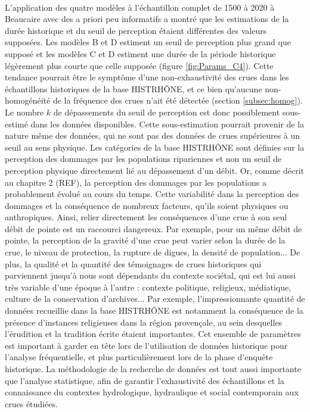 	\paragraph{} L'application des quatre modèles à l'échantillon complet de 1500 à 2020 à Beaucaire avec des a priori peu informatifs a montré que les estimations de la durée historique et du seuil de perception étaient différentes des valeurs supposées. Les modèles B et D estiment un seuil de perception plus grand que supposé et les modèles C et D estiment une durée de la période historique légèrement plus courte que celle supposée (figure \ref{fig:Params_C4}). Cette tendance pourrait être le symptôme d'une non-exhaustivité des crues dans les échantillons historiques de la base HISTRHÔNE, et ce bien qu'aucune non-homogénéité de la fréquence des crues n'ait été détectée (section \ref{subsec:homog}). Le nombre $k$ de dépassements du seuil de perception est donc possiblement sous-estimé dans les données disponibles. Cette sous-estimation pourrait provenir de la nature même des données, qui ne sont pas des données de crues supérieures à un seuil au sens physique. Les catégories de la base HISTRHÔNE sont définies sur la perception des dommages par les populations ripariennes et non un seuil de perception physique directement lié au dépassement d'un débit. Or, comme décrit au chapitre 2 (REF), la perception des dommages par les populations a probablement évolué au cours du temps. Cette variabilité dans la perception des dommages et la conséquence de nombreux facteurs, qu'ils soient physiques ou anthropiques. Ainsi, relier directement les conséquences d'une crue à son seul débit de pointe est un raccourci dangereux. Par exemple, pour un même débit de pointe, la perception de la gravité d'une crue peut varier selon la durée de la crue, le niveau de protection, la rupture de digues, la densité de population... De plus, la qualité et la quantité des témoignages de crues historiques qui parviennent jusqu'à nous sont dépendants du contexte sociétal, qui est lui aussi très variable d'une époque à l'autre : contexte politique, religieux, médiatique, culture de la conservation d'archives... Par exemple, l'impressionnante quantité de données recueillie dans la base HISTRHÔNE est notamment la conséquence de la présence d'instances religieuses dans la région provençale, au sein desquelles l'érudition et la tradition écrite étaient importantes. Cet ensemble de paramètres est important à garder en tête lors de l'utilisation de données historique pour l'analyse fréquentielle, et plus particulièrement lors de la phase d'enquête historique. La méthodologie de la recherche de données est tout aussi importante que l'analyse statistique, afin de garantir l'exhaustivité des échantillons et la connaissance du contextes hydrologique, hydraulique et social contemporain aux crues étudiées. 	
	
